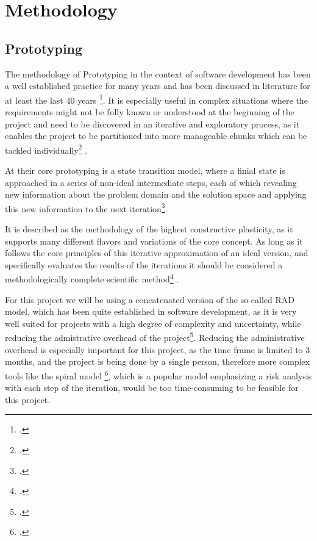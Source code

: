 \chapter{Methodology}
\label{methodology}

\section{Prototyping}


The methodology of Prototyping in the context of software development has been a well established practice for many years and
has been discussed in literature for at least the last 40 years \footcite{gomaaImpactRapidPrototyping1983}.
It is especially useful in complex situations where the requirements might not be fully known or understood at the beginning of the project
and need to be discovered in an iterative and exploratory process, 
as it enables the project to be partitioned into more manageable chunks which can be tackled individually\footcite{naumannPrototypingNewParadigm1982} .

At their core prototyping is a state transition model, where a finial state is approached in a series of non-ideal intermediate steps,
each of which revealing new information about the problem domain and the solution space and applying this new information to the next iteration\footcite{kraushaarPrototypingMethodApplications1985}.

It is described as the methodology of the highest constructive plasticity, as it supports many different flavors and variations of the core concept.
As long as it follows the core principles of this iterative approximation of an ideal version, and specifically evaluates the results of the iterations it should be considered a methodologically complete scientific method\footcite{wildeMethodenspektrumWirtschaftsinformatikUeberblick} .

For this project we will be using a concatenated version of the so called \ac{RAD} model, which has been quite established in software development, as it is very well suited for projects with a high degree of complexity and uncertainty, while reducing the admistrative overhead of the project\footcite{martinRapidApplicationDevelopment1991}.
Reducing the administrative overhead is especially important for this project, as the time frame is limited to 3 months, and the project is being done by a single person, 
therefore more complex tools like the spiral model \footcite{boehmSpiralModelSoftware1988}, which is a popular model emphasizing a risk analysis with each step of the iteration, 
would be too time-consuming to be feasible for this project.


